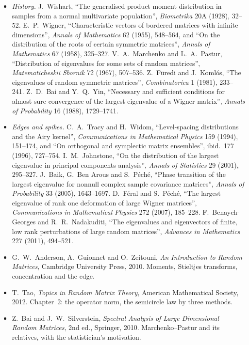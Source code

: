 \begin{itemize}
\item \emph{History.} J.~Wishart, ``The generalised product moment distribution in samples from a normal multivariate population'', \emph{Biometrika} 20A (1928), 32--52. E.~P.~Wigner, ``Characteristic vectors of bordered matrices with
infinite dimensions'', \emph{Annals of Mathematics} 62 (1955), 548--564, and ``On the distribution of the roots of certain symmetric matrices'', \emph{Annals of Mathematics} 67 (1958), 325--327. V.~A.~Marchenko and L.~A.~Pastur,
``Distribution of eigenvalues for some sets of random matrices'', \emph{Matematicheskii Sbornik} 72 (1967), 507--536. Z.~F\"uredi and J.~Koml\'os, ``The eigenvalues of random symmetric matrices'', \emph{Combinatorica} 1 (1981),
233--241. Z.~D.~Bai and Y.~Q.~Yin, ``Necessary and sufficient conditions for almost sure convergence of the largest eigenvalue of a Wigner matrix'', \emph{Annals of Probability} 16 (1988), 1729--1741.
\item \emph{Edges and spikes.} C.~A.~Tracy and H.~Widom, ``Level-spacing distributions and the Airy kernel'', \emph{Communications in Mathematical Physics} 159 (1994), 151--174, and ``On orthogonal and symplectic matrix ensembles'',
ibid.\ 177 (1996), 727--754. I.~M.~Johnstone, ``On the distribution of the largest eigenvalue in principal components analysis'', \emph{Annals of Statistics} 29 (2001), 295--327. J.~Baik, G.~Ben Arous and S.~P\'ech\'e, ``Phase transition
of the largest eigenvalue for nonnull complex sample covariance matrices'', \emph{Annals of Probability} 33 (2005), 1643--1697. D.~F\'eral and S.~P\'ech\'e, ``The largest eigenvalue of rank one deformation of large Wigner matrices'',
\emph{Communications in Mathematical Physics} 272 (2007), 185--228. F.~Benaych-Georges and R.~R.~Nadakuditi, ``The eigenvalues and eigenvectors of finite, low rank perturbations of large random matrices'', \emph{Advances in
Mathematics} 227 (2011), 494--521.
\item G.~W.~Anderson, A.~Guionnet and O.~Zeitouni, \emph{An Introduction to Random Matrices}, Cambridge University Press, 2010. Moments, Stieltjes transforms, concentration and the edge.
\item T.~Tao, \emph{Topics in Random Matrix Theory}, American Mathematical Society, 2012. Chapter~2: the operator norm, the semicircle law by three methods.
\item Z.~Bai and J.~W.~Silverstein, \emph{Spectral Analysis of Large Dimensional Random Matrices}, 2nd ed., Springer, 2010. Marchenko--Pastur and its relatives, with the statistician's motivation.
\end{itemize}
